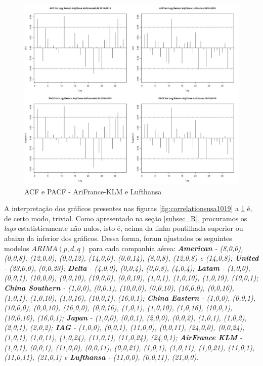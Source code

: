 \documentclass[12pt]{article}
\begin{document}
\begin{figure}[H]
	\centering
	\includegraphics[width=0.8\linewidth]{../Modelos/CorrelationsAirKLM10_19}
	\caption{ACF e PACF - AriFrance-KLM e Lufthansa}
	\label{fig:correlationsairklm1019}
\end{figure}

A interpretação dos gráficos presentes nas figuras \ref{fig:correlationsusa1019} a \ref{fig:correlationsairklm1019} é, de certo modo, trivial. Como apresentado na seção \ref{subsec_R}, procuramos os \textit{lags} estatisticamente não nulos, isto é, acima da linha pontilhada superior ou abaixo da inferior dos gráficos. Dessa forma, foram ajustados os seguintes modelos $ARIMA(p,d,q)$ para cada companhia aérea: \emph{\textbf{American} - (8,0,0), (0,0,8), (12,0,0), (0,0,12), (14,0,0), (0,0,14), (8,0,8), (12,0,8) e (14,0,8); \textbf{United} - (23,0,0), (0,0,23); \textbf{Delta} - (4,0,0), (0,0,4), (0,0,8), (4,0,4); \textbf{Latam} - (1,0,0), (0,0,1), (10,0,0), (0,0,10), (19,0,0), (0,0,19), (1,0,1), (1,0,10), (1,0,19), (10,0,1); \textbf{China Southern} - (1,0,0), (0,0,1), (10,0,0), (0,0,10), (16,0,0), (0,0,16), (1,0,1), (1,0,10), (1,0,16), (10,0,1), (16,0,1); \textbf{China Eastern} - (1,0,0), (0,0,1), (10,0,0), (0,0,10), (16,0,0), (0,0,16), (1,0,1), (1,0,10), (1,0,16), (10,0,1), (10,0,16), (16,0,1); \textbf{Japan} - (1,0,0), (0,0,1), (2,0,0), (0,0,2), (1,0,1), (1,0,2), (2,0,1), (2,0,2); \textbf{IAG} - (1,0,0), (0,0,1), (11,0,0), (0,0,11), (24,0,0), (0,0,24), (1,0,1), (1,0,11), (1,0,24), (11,0,1), (11,0,24), (24,0,1); \textbf{AirFrance KLM} - (1,0,1), (0,0,1), (11,0,0), (0,0,11), (0,0,21), (1,0,1), (1,0,11), (1,0,21), (11,0,1), (11,0,11), (21,0,1) e \textbf{Lufthansa} - (11,0,0), (0,0,11), (21,0,0)}.
\end{document}
